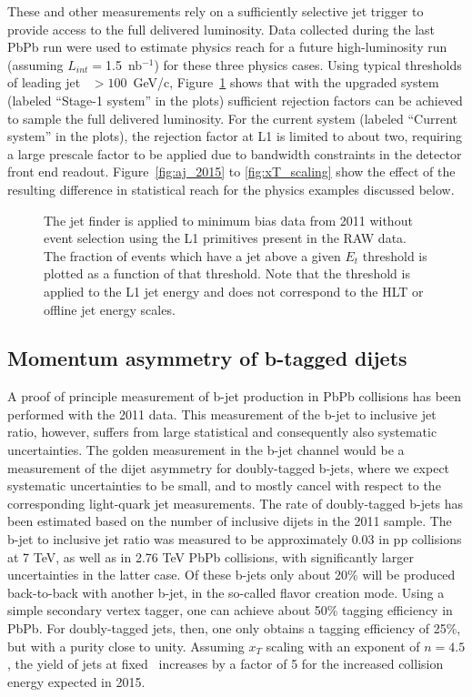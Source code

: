 These and other measurements rely on a sufficiently selective jet trigger to provide access to the 
full delivered luminosity.  Data collected during the last PbPb run were used to estimate physics reach  
for a future high-luminosity run (assuming $L_{int} =$1.5~nb$^{-1}$) for these three physics cases. Using
typical thresholds of leading jet \pt\ $>100$~GeV/c, Figure~\ref{fig:efficiency_comparison} shows that 
with the upgraded system (labeled ``Stage-1 system'' in the plots) sufficient rejection factors can be 
achieved to sample the full delivered luminosity. For the current system (labeled ``Current system'' in the 
plots), the rejection factor at L1 is limited to about two, requiring a large prescale factor to be applied
due to bandwidth constraints in the detector front end readout. Figure~\ref{fig:aj_2015} to 
\ref{fig:xT_scaling} show the effect of the resulting difference in statistical reach 
for the physics examples discussed below.

\begin{figure}[!ht]
\begin{center}
\caption{The jet finder is applied to minimum bias data from 2011 without
event selection using the L1 primitives present in the RAW data. The
fraction of events which have a jet above a given $E_t$ threshold is plotted
as a function of that threshold. Note that the threshold is applied to the
L1 jet energy and does not correspond to the HLT or offline jet energy
scales.}
\label{fig:efficiency_comparison}
\end{center}
\end{figure}


\subsection{Momentum asymmetry of b-tagged dijets}

A proof of principle measurement of b-jet production in PbPb collisions has
been performed with the 2011 data.  
This measurement of the b-jet to inclusive jet ratio, however, suffers from
large statistical and consequently also systematic uncertainties.  
The golden measurement in the b-jet channel would be a measurement of the
dijet asymmetry for doubly-tagged b-jets, 
where we expect systematic uncertainties to be small, and to mostly cancel
with respect to the corresponding light-quark jet measurements.  
The rate of doubly-tagged b-jets has been estimated based on the number
of inclusive dijets in the 2011 sample.  
The b-jet to inclusive jet ratio was measured to be approximately 0.03 in pp
collisions at 7 TeV, as well as in 2.76 TeV PbPb collisions, with 
significantly larger uncertainties in the latter case.  Of these b-jets only
about 20\% will be produced back-to-back with another b-jet, 
in the so-called flavor creation mode.  Using a simple secondary vertex
tagger, one can achieve about 50\% tagging efficiency in PbPb.  
For doubly-tagged jets, then, one only obtains a tagging efficiency of 25\%,
but with a purity close to unity.  
Assuming $x_{T}$ scaling with an exponent of $n = 4.5$, the yield of jets at
fixed \pt\ increases by a factor of 5 for the increased collision energy 
expected in 2015.  

